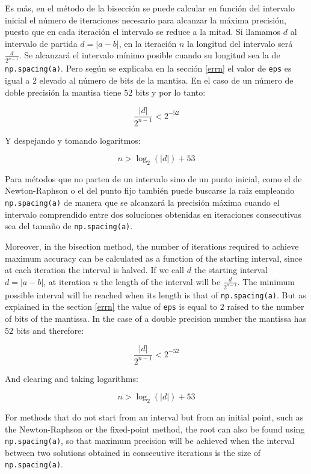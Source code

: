 \begin{paracol}{2}
Es más, en el método de la bisección se puede calcular en función del intervalo inicial el número de iteraciones necesario para alcanzar la máxima precisión, puesto que en cada iteración el intervalo se reduce a la mitad. Si llamamos $d$ al intervalo de partida $d=\vert a-b \vert$, en la iteración $n$ la longitud del intervalo será $\frac{d}{2^{n-1}}$. Se alcanzará el intervalo mínimo posible cuando su longitud sea la de \texttt{np.spacing(a)}. Pero según se explicaba en la sección \ref{errn} el valor de \texttt{eps} es igual a $2$ elevado al número de bits de la mantisa. En el caso de un número de doble precisión la mantisa tiene $52$ bits y por lo tanto:

\begin{equation*}
\frac{\vert d \vert}{2^{n-1}}<2^{-52} 
\end{equation*}

Y despejando y tomando logaritmos:

\begin{equation*}
n > \log_{2}(\vert d \vert)+53
\end{equation*}

Para métodos que no parten de un intervalo sino de un punto inicial, como el de Newton-Raphson o el del punto fijo también puede buscarse la raiz empleando \texttt{np.spacing(a)} de manera que se alcanzará la precisión máxima cuando el intervalo comprendido entre dos soluciones obtenidas en iteraciones consecutivas sea del tamaño de \texttt{np.spacing(a)}. 

\switchcolumn
Moreover, in the bisection method, the number of iterations required to achieve maximum accuracy can be calculated as a function of the starting interval, since at each iteration the interval is halved. If we call $d$ the starting interval $d=\vert a-b \vert$, at iteration $n$ the length of the interval will be $\frac{d}{2^{n-1}}$. The minimum possible interval will be reached when its length is that of \texttt{np.spacing(a)}. But as explained in the section \ref{errn} the value of \texttt{eps} is equal to $2$ raised to the number of bits of the mantissa. In the case of a double precision number the mantissa has $52$ bits and therefore:

\begin{equation*}
\frac{\vert d \vert}{2^{n-1}}<2^{-52} 
\end{equation*}

And clearing and taking logarithms:

\begin{equation*}
n > \log_{2}(\vert d \vert)+53
\end{equation*}

For methods that do not start from an interval but from an initial point, such as the Newton-Raphson or the fixed-point method, the root can also be found using \texttt{np.spacing(a)}, so that maximum precision will be achieved when the interval between two solutions obtained in consecutive iterations is the size of \texttt{np.spacing(a)}.
\end{paracol}



